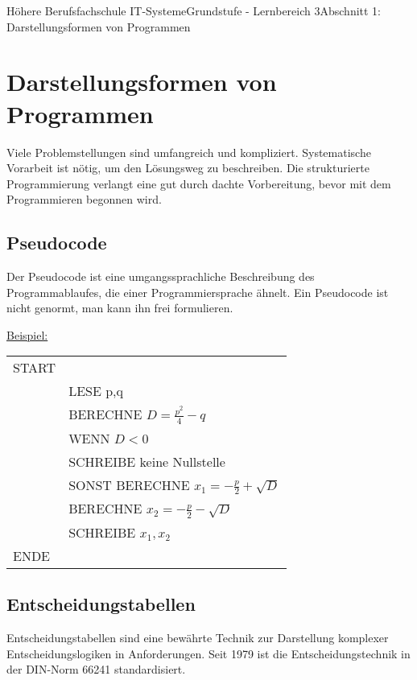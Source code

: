 \documentclass[11pt,oneside,openany,headings=optiontotoc,11pt,numbers=noenddot]{article}
\begin{document}
	\begin{worksheet}{Höhere Berufsfachschule IT-Systeme}{Grundstufe - Lernbereich 3}{Abschnitt 1: Darstellungsformen von Programmen}
		\section{Darstellungsformen von Programmen}
		Viele Problemstellungen sind umfangreich und kompliziert. Systematische Vorarbeit ist nötig, um den Lösungsweg zu beschreiben. Die strukturierte Programmierung verlangt eine gut durch dachte Vorbereitung, bevor mit dem Programmieren begonnen wird.
		\subsection{Pseudocode}
		Der Pseudocode ist eine umgangssprachliche Beschreibung des Programmablaufes, die einer Programmiersprache ähnelt. Ein Pseudocode ist nicht genormt, man kann ihn frei formulieren.
		\begin{framed}
			\noindent
			\underline{Beispiel:}\\
			\begin{itshape}
				\begin{tabularx}{\textwidth}{lX}
					START\\
					& LESE p,q\\
					& BERECHNE \(D = \frac{p^2}{4} - q\)\\
					& WENN \(D < 0\)\\
					& SCHREIBE \grqq{}keine Nullstelle\grqq{}\\
					& SONST BERECHNE \(x_1 = -\frac{p}{2} + \sqrt{D}\)\\
					& BERECHNE \(x_2 = -\frac{p}{2} - \sqrt{D}\)\\
					& SCHREIBE \(x_1, x_2\)\\
					ENDE
				\end{tabularx}
			\end{itshape}
		\end{framed}
		\subsection{Entscheidungstabellen}
		Entscheidungstabellen sind eine bewährte Technik zur Darstellung komplexer Entscheidungslogiken in Anforderungen. Seit 1979 ist die Entscheidungstechnik in der DIN-Norm 66241 standardisiert.

\end{worksheet}
\end{document}
